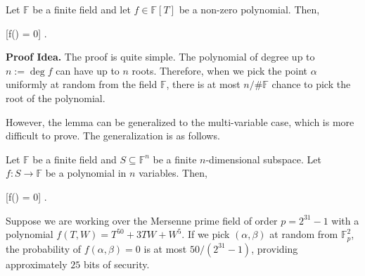 \documentclass[../../book.tex]{subfiles}
\begin{document}
\vspace{-0.6mm}

\begin{lemma}\label{lemma:one-sz} Let
    $\mathbb{F}$ be a finite field and let $f \in \mathbb{F}[T]$ be a non-zero
    polynomial. Then,
    \begin{xequation}
        [f(\alpha) = 0] \leq {}.
    \end{xequation}
\end{lemma}

\vspace{-0.6mm}

\textbf{Proof Idea.} The proof is quite simple. The polynomial of degree up to
$n:=\deg f$ can have up to $n$ roots. Therefore, when we pick the point $\alpha$
uniformly at random from the field $\mathbb{F}$, there is at most $n/\#\mathbb{F}$
chance to pick the root of the polynomial.

However, the lemma can be generalized to the multi-variable case, which is more
difficult to prove. The generalization is as follows.

\vspace{-0.6mm}

\begin{lemma} \label{lemma:sz} Let $\mathbb{F}$
    be a finite field and $S \subseteq \mathbb{F}^n$ be a finite
    $n$-dimensional subspace. Let $f: S \to \mathbb{F}$ be a polynomial
    in $n$ variables. Then,
    
    \vspace{-1.1mm}
    
    \begin{xequation}
        [f(\bm{\alpha}) = 0] \leq {}.
    \end{xequation}
\end{lemma}

\vspace{-4.1mm}

\begin{example}
Suppose we are working over the Mersenne prime field of order $p=2^{31}-1$ with
a polynomial $f(T,W) = T^{50} + 3TW + W^5$. If we pick $(\alpha,\beta)$
at random from $\mathbb{F}_p^2$, the probability of $f(\alpha,\beta) = 0$ is at most
$50/(2^{31}-1)$, providing approximately $25$ bits of security.
\end{example}
\end{document}
